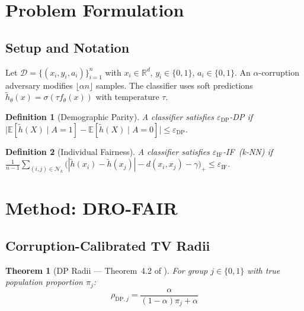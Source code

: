 \documentclass[11pt,a4paper]{article}
\newtheorem{theorem}{Theorem}
\newtheorem{definition}{Definition}
\newcommand{\R}{\mathbb{R}}
\newcommand{\E}{\mathbb{E}}
\newcommand{\htilde}{\tilde{h}}
\newcommand{\rDP}[1][]{\rho_{\mathrm{DP}#1}}
\begin{document}
\section{Problem Formulation}

\subsection{Setup and Notation}

Let $\mathcal{D} = \{(x_i, y_i, a_i)\}_{i=1}^n$ with $x_i\in\R^d$,
$y_i\in\{0,1\}$, $a_i\in\{0,1\}$.  An $\alpha$-corruption adversary modifies
$\lfloor\alpha n\rfloor$ samples.  The classifier uses soft predictions
$\htilde_\theta(x) = \sigma(\tau f_\theta(x))$ with temperature $\tau$.

\begin{definition}[Demographic Parity]
A classifier satisfies $\varepsilon_{\mathrm{DP}}$-DP if
$\bigl|\E[\htilde(X)\mid A=1] - \E[\htilde(X)\mid A=0]\bigr| \le \varepsilon_{\mathrm{DP}}$.
\end{definition}

\begin{definition}[Individual Fairness]
A classifier satisfies $\varepsilon_{\mathrm{IF}}$-IF~(k-NN) if
$\frac{1}{n-1}\sum_{(i,j)\in\mathcal{N}_k}
\bigl(|\htilde(x_i)-\htilde(x_j)| - d(x_i,x_j)-\gamma\bigr)_+
\le \varepsilon_{\mathrm{IF}}$.
\end{definition}

\section{Method: DRO-FAIR}

\subsection{Corruption-Calibrated TV Radii}

\begin{theorem}[DP Radii --- Theorem~4.2 of \citealt{drofair2026}]
For group $j\in\{0,1\}$ with true population proportion $\pi_j$:
\begin{equation}
  \rDP[{,j}] = \frac{\alpha}{(1-\alpha)\pi_j + \alpha}
  \label{eq:dp_radius}
\end{equation}
\end{theorem}
\end{document}

